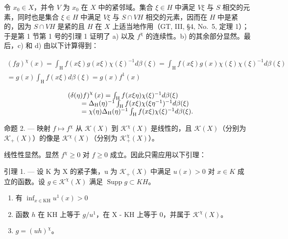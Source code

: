 令 \(x_0 \in X\)，并令 \(V\) 为 \(x_0\) 在 \(X\) 中的紧邻域。集合 \(\xi \in H\) 中满足 \(V\xi\) 与 \(S\) 相交的元素，同时也是集合 \(\xi \in H\) 中满足 \(V\xi\) 与 \(S \cap VH\) 相交的元素，因而在 \(H\) 中是紧的，因为 \(S \cap VH\) 是紧的且 \(H\) 在 \(X\) 上适当地作用（GT, III, §4, No.~5, 定理 1）；于是第 1 节第 1 号的引理 1 证明了 a) 以及 \(f^{\chi}\) 的连续性。b) 的其余部分显然。最后，c) 和 d) 由以下计算得到：

\[
\begin{array}{c} (f g) ^ {\chi} (x) = \int_ {\mathrm{H}} f (x \xi) g (x \xi) \chi (\xi) ^ {- 1} d \beta (\xi) = \int_ {\mathrm{H}} f (x \xi) g (x) \chi (\xi) \chi (\xi) ^ {- 1} d \beta (\xi) \\ = g (x) \int_ {\mathrm{H}} f (x \xi) d \beta (\xi) = g (x) f ^ {1} (x) \end{array}
\]

\[
\begin{array}{r l} & {\left(\delta (\eta) f\right) ^ {\chi} (x) = \int_ {\mathrm{H}} f (x \xi \eta) \chi (\xi) ^ {- 1} d \beta (\xi)} \\ & {\qquad = \Delta_ {\mathrm{H}} (\eta) ^ {- 1} \int_ {\mathrm{H}} f (x \xi) \chi (\xi \eta^ {- 1}) ^ {- 1} d \beta (\xi)} \\ & {\qquad = \chi (\eta) \Delta_ {\mathrm{H}} (\eta) ^ {- 1} \int_ {\mathrm{H}} f (x \xi) \chi (\xi) ^ {- 1} d \beta (\xi).} \end{array}
\]

命题 2. --- 映射 \(f \mapsto f^{\chi}\) 从 \(\mathcal{K}(X)\) 到 \(\mathcal{K}^{\chi}(X)\) 是线性的，且 \(\mathcal{K}(X)\)（分别为 \(\mathcal{K}_{+}(X)\)）的像是 \(\mathcal{K}^{\chi}(X)\)（分别为 \(\mathcal{K}_{+}^{\chi}(X)\)）。

线性性显然。显然 \(f^{\chi} \geqslant 0\) 对 \(f \geqslant 0\) 成立。因此只需应用以下引理：

引理 1. --- 设 K 为 X 的紧子集，u 为 \(\mathcal{K}_{+}(X)\) 中满足 \(u(x) > 0\) 对 \(x \in K\) 成立的函数。设 \(g \in \mathcal{K}^{\chi}(X)\) 满足 \(\operatorname{Supp} g \subset KH\)。

\begin{enumerate}
\def\labelenumi{\alph{enumi})}
\item
有 \(\inf_{x\in \mathrm{KH}}u^1 (x) > 0\)
\item
函数 \(h\) 在 KH 上等于 \(g / u^1\)，在 X - KH 上等于 0，并属于 \(\mathcal{K}^{\chi}(X)\)。
\item
  \(g = (uh)^{\chi}\)。
\end{enumerate}

